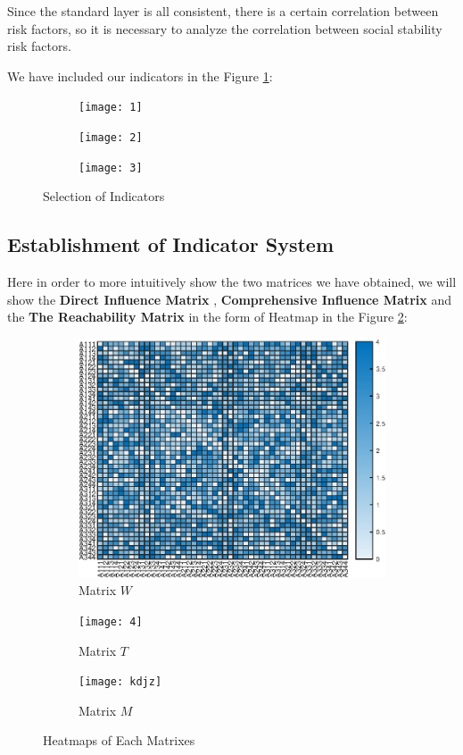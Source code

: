 \documentclass[12pt]{article}  %
\begin{document}
Since the standard layer is all consistent, there is a certain correlation between risk factors, so it is necessary to analyze the correlation between social stability risk factors.

We have included our indicators in the Figure \ref{soi}:
\begin{figure}[htbp]
\centering
\begin{subfigure}[b]{.32\textwidth}
\texttt{[image: 1]}
\end{subfigure}
\begin{subfigure}[b]{.32\textwidth}
\texttt{[image: 2]}
\end{subfigure}
\begin{subfigure}[b]{.32\textwidth}
\texttt{[image: 3]}
\end{subfigure}
\caption{Selection of Indicators}\label{soi}
\end{figure}
\subsection{Establishment of Indicator System}
Here in order to more intuitively show the two matrices we have obtained, we will show the \textbf{Direct Influence Matrix} , \textbf{Comprehensive Influence Matrix}  and the \textbf{The Reachability Matrix}  in the form of Heatmap in the Figure \ref{heatmap}:
\begin{figure}[htbp]
\centering
\begin{subfigure}[b]{.32\textwidth}
\includegraphics[width=\textwidth]{img/h2.eps}
\caption{Matrix $W$}
\end{subfigure}
\begin{subfigure}[b]{.32\textwidth}
\texttt{[image: 4]}
\caption{Matrix $T$}
\end{subfigure}
\begin{subfigure}[b]{.32\textwidth}
\texttt{[image: kdjz]}
\caption{Matrix $M$}
\end{subfigure}
\caption{Heatmaps of Each Matrixes}
\label{heatmap}
\end{figure}
\end{document}
